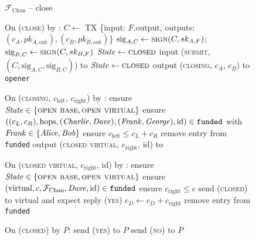 \begin{figure}[H]
  \begin{systembox}{$\mathcal{F}_{\mathrm{Chan}}$ -- close}
    \begin{algorithmic}[1]
      \State On (\textsc{close}) by \alice:
      \Indent
          \State $C \gets$ TX \{input: $F$.output, outputs: $(c_A, pk_{A,
          \mathrm{out}}), (c_B, pk_{B, \mathrm{out}})$\}
          \State $\mathrm{sig}_{A, C} \gets \textsc{sign}(C, sk_{A, F})$;
          $\mathrm{sig}_{B, C} \gets \textsc{sign}(C, sk_{B, F})$
          \State $\mathit{State} \gets \textsc{closed}$
          \State input (\textsc{submit}, $(C, \mathrm{sig}_{A, C},
          \mathrm{sig}_{B, C})$) to \ledger
          \State $\mathit{State} \gets \textsc{closed}$
          \State output (\textsc{closing}, $c_A$, $c_B$) to \texttt{opener}
        \EndIf
      \EndIndent
      \Statex

      \State On (\textsc{closing}, $c_{\mathrm{left}}$, $c_{\mathrm{right}}$) by
      \fchan:
      \Indent
        \State ensure $\mathit{State} \in \{\textsc{open base}, \textsc{open
        virtual}\}$
        \State ensure $((c_L, c_R), \mathrm{hops}, (\mathit{Charlie}, \mathit{Dave}), (\mathit{Frank},
        \mathit{George}), \mathrm{id}) \in \mathtt{funded}$ with $\mathit{Frank} \in \{\mathit{Alice},
        \mathit{Bob}\}$
        \State ensure $c_{\mathrm{left}} \leq c_L + c_R$
        \State remove entry from \texttt{funded}
        \State output (\textsc{closed virtual}, $c_{\mathrm{right}}$, id) to
        \frank
      \EndIndent
      \Statex

      \State On (\textsc{closed virtual}, $c_{\mathrm{right}}$, id) by \fchan:
      \Indent
        \State ensure $\mathit{State} \in \{\textsc{open base}, \textsc{open
        virtual}\}$
        \State ensure $(\mathrm{virtual}, c, \mathcal{F}_{\mathrm{Chan}}, \mathit{Dave}, \mathrm{id}) \in
        \mathtt{funded}$
        \State ensure $c_{\mathrm{right}} \leq c$
        \State send (\textsc{closed}) to virtual and expect reply (\textsc{yes})
        \State $c_D \gets c_D + c_{\mathrm{right}}$
        \State remove entry from \texttt{funded}
      \EndIndent
      \Statex

      \State On (\textsc{closed}) by $P$:
      \Indent
          \State send (\textsc{yes}) to $P$
        \Else
          \State send (\textsc{no}) to $P$
        \EndIf
      \EndIndent
    \end{algorithmic}
  \end{systembox}
  \caption{}
  \label{code:functionality:chan:skeleton:close}
\end{figure}

